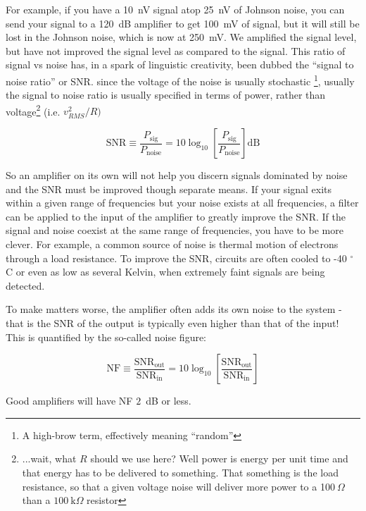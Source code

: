 \documentclass{tufte-book}
\begin{document}
For example, if you have a 10~nV signal atop 25~nV of Johnson noise, you can send your signal to a 120~dB amplifier to get 100~mV of signal, but it will still be lost in the Johnson noise, which is now at 250~mV.  We amplified the signal level, but have not improved the signal level as compared to the signal. This ratio of signal vs noise has, in a spark of linguistic creativity, been dubbed the ``signal to noise ratio'' or SNR. since the voltage of the noise is usually stochastic \footnote{ A high-brow term, effectively meaning ``random''}, usually the signal to noise ratio is usually specified in terms of power, rather than voltage\footnote{ ...wait, what $R$ should we use here? Well power is energy per unit time and that energy has to be delivered to something. That something is the load resistance, so that a given voltage noise will deliver more power to a 1$00~\Omega$ than a $100~\text{k}\Omega$ resistor} (i.e. $v_{RMS}^2/R)$

\begin{equation}
\label{eq:def_snr}
\text{SNR} \equiv \frac{P_\text{sig}}{P_\text{noise}} = 10\log_{10}\left[\frac{P_\text{sig}}{P_\text{noise}}\right] \text{dB}
\end{equation}

So an amplifier on its own will not help you discern signals dominated by noise and the SNR must be improved though separate means. If your signal exits within a given range of frequencies but your noise exists at all frequencies, a filter can be applied to the input of the amplifier to greatly improve the SNR. If the  signal and noise coexist at the same range of frequencies, you have to be more clever. For example, a common source of noise is thermal motion of electrons through a load resistance. To improve the SNR, circuits are often cooled to -40 $^\circ$C or even as low as several Kelvin, when extremely faint signals are being detected.

To make matters worse, the amplifier often adds its own noise to the system - that is the SNR of the output is typically even higher than that of the input! This is quantified by the so-called noise figure:

\begin{equation}
\label{eq:def_noise_figure}
\text{NF} \equiv \frac{\text{SNR}_\text{out}}{\text{SNR}_\text{in}} = 10\log_{10}\left[\frac{\text{SNR}_\text{out}}{\text{SNR}_\text{in}}\right]
\end{equation}

\noindent Good amplifiers will have NF $2$~dB or less.
\end{document}

